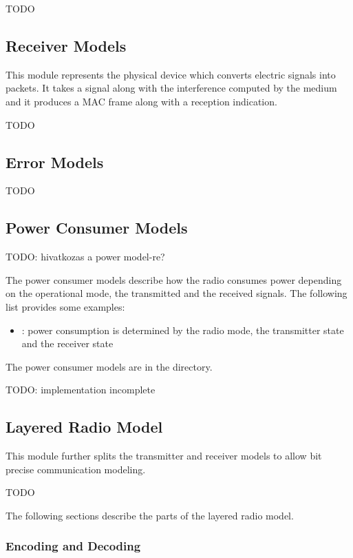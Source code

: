 TODO

\subsection{Receiver Models}

This module represents the physical device which converts electric signals into
packets. It takes a signal along with the interference computed by the medium
and it produces a MAC frame along with a reception indication.

TODO

\subsection{Error Models}

TODO

\subsection{Power Consumer Models}

TODO: hivatkozas a power model-re?

The power consumer models describe how the radio consumes power depending on the
operational mode, the transmitted and the received signals. The following list
provides some examples:

\begin{itemize}
  \item {}: power consumption is determined by the
radio mode, the transmitter state and the receiver state
\end{itemize}

The power consumer models are in the  directory.

\iffalse TODO: implementation incomplete
\subsection{Layered Radio Model}

This module further splits the transmitter and receiver models to allow bit
precise communication modeling.

TODO

The following sections describe the parts of the layered radio model.

\subsubsection{Encoding and Decoding}


